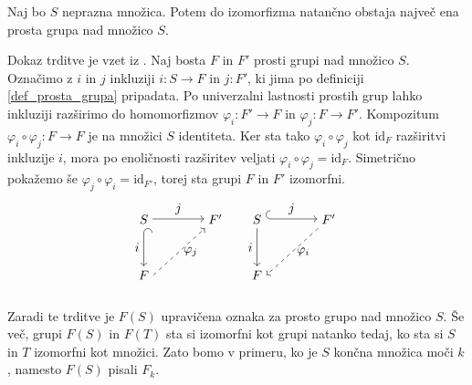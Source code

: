 \begin{trditev}
\label{trd_enolicnost_prostih_grup}
 Naj bo $S$ neprazna množica. Potem do izomorfizma natančno obstaja največ ena prosta grupa nad množico $S$.
\end{trditev}
\begin{dokaz}
Dokaz trditve je vzet iz \cite[str.~4]{Pogacnik_2024}.
Naj bosta $F$ in $F'$ prosti grupi nad množico $S$. Označimo z $i$ in $j$ inkluziji $i : S \to F$ in $j : F'$, ki jima po definiciji \ref{def_prosta_grupa} pripadata. Po univerzalni lastnosti prostih grup lahko inkluziji
razširimo do homomorfizmov $\varphi_i : F' \to F$ in $\varphi_j : F \to F'$. 
Kompozitum $\varphi_i \circ \varphi_j : F \to F$ je na množici $S$ identiteta. Ker sta tako $\varphi_i \circ \varphi_j$ kot $\text{id}_F$ razširitvi inkluzije $i$,
mora po enoličnosti razširitev veljati $\varphi_i \circ \varphi_j = \text{id}_F$. Simetrično pokažemo še $\varphi_j \circ \varphi_i  = \text{id}_{F'}$, torej sta grupi $F$ in $F'$ izomorfni.
\[
\begin{tikzpicture}
    \matrix (m1)
      [
        matrix of math nodes,
        row sep    = 3em,
        column sep = 4em
      ]
      {
        S    & F' \\
        F  &             \\
      };
    \path
      (m1-1-1) edge [{Hooks[right,length=0.8ex]}->] node [left] {$i$} (m1-2-1)
      (m1-1-1.east |- m1-1-2)
        edge [->] node [above] {$j$} (m1-1-2)
      (m1-2-1.east) edge [ ->,
        dashed] node [right] {$\varphi_j$} (m1-1-2);
\end{tikzpicture}
\quad
\begin{tikzpicture}
    \matrix (m2)
      [
        matrix of math nodes,
        row sep    = 3em,
        column sep = 4em
      ]
      {
        S    & F' \\
        F  &             \\
      };
    \path
      (m2-1-1) edge [->] node [left] {$i$} (m2-2-1)
      (m2-1-1.east |- m2-1-2)
        edge [{Hooks[right,length=0.8ex]}->] node [above] {$j$} (m2-1-2)
        (m2-1-2) edge [ ->,
        dashed] node [right] {$\varphi_i$} (m2-2-1.east) ;
\end{tikzpicture}\]
\end{dokaz}

Zaradi te trditve je $F(S)$ upravičena oznaka za prosto grupo nad množico $S$. Še več, grupi $F(S)$ in $F(T)$ sta si izomorfni kot grupi natanko tedaj, ko sta si $S$ in $T$ izomorfni kot množici.
Zato bomo v primeru, ko je $S$ končna množica moči $k$, namesto $F(S)$ pisali $F_k$.

